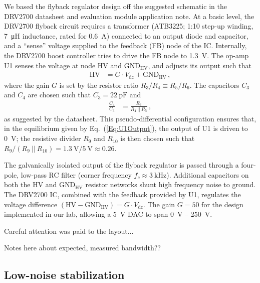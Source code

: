 \documentclass[aip,rsi,reprint]{revtex4-1} %
\begin{document}
We based the flyback regulator design off the suggested schematic in the DRV2700 datasheet and evaluation module application note.
At a basic level, the DRV2700 flyback circuit requires a transformer (ATB3225; 1:10 step-up winding, \SI{7}{\micro\henry} inductance, rated for \SI{0.6}{\ampere}) connected to an output diode and capacitor, and a ``sense'' voltage supplied to the feedback (FB) node of the IC.
Internally, the DRV2700 boost controller tries to drive the FB node to \SI{1.3}{\volt}.
The op-amp U1 senses the voltage at node HV and $\text{GND}_\text{HV}$, and adjusts its output such that
\begin{align}
\label{Eq:U1Output}
\text{HV} &= G\cdot V_{\text{dc}} + \text{GND}_{\text{HV}}\,,
\end{align}
where the gain $G$ is set by the resistor ratio $R_3/R_4 \equiv R_5/R_6$.
The capacitors $C_3$ and $C_4$ are chosen such that $C_3 = \SI{22}{\pico\farad}$ and 
\begin{align}
\frac{C_4}{C_3} &= \frac{R_3}{R_4~||~R_5}\,,
\end{align}
as suggested by the datasheet.
This pseudo-differential configuration ensures that, in the equilibrium given by Eq.~(\ref{Eq:U1Output}), the output of U1 is driven to \SI{0}{\volt}; the resistive divider $R_9$ and $R_{10}$ is then chosen such that $R_9/(R_9~||~R_{10}) = \SI{1.3}{\volt}/\SI{5}{\volt} \approx \num{0.26}$.

The galvanically isolated output of the flyback regulator is passed through a four-pole, low-pass RC filter (corner frequency $f_c \approx \SI{3}{\kilo\hertz}$). 
Additional capacitors on both the HV and $\text{GND}_{\text{HV}}$ resistor networks shunt high frequency noise to ground. 
The DRV2700 IC, combined with the feedback provided by U1, regulates the voltage difference $(\text{HV}-\text{GND}_{\text{HV}}) = G\cdot V_{\text{dc}}$. The gain $G = 50$ for the design implemented in our lab, allowing a \SI{5}{\volt} DAC to span \SI{0}{\volt} -- \SI{250}{\volt}.


Careful attention was paid to the layout...

Notes here about expected, measured bandwidth??


\subsection{Low-noise stabilization}
\label{Sec:LowNoiseStabilization}
\end{document}
